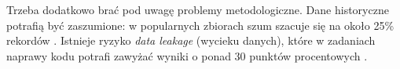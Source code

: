 Trzeba dodatkowo brać pod uwagę problemy metodologiczne. Dane historyczne 
potrafią być zaszumione: w popularnych zbiorach szum szacuje się na około 25\% rekordów \cite{Tufano2024CodeReviewAutomation}.
Istnieje ryzyko \textit{data leakage} (wycieku danych), które w zadaniach naprawy kodu 
potrafi zawyżać wyniki o ponad 30 punktów procentowych \cite{Germano2025VulnSLR}.
